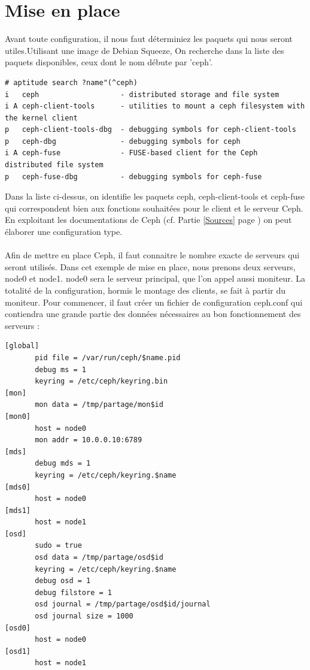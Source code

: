 \documentclass[12pt]{report}
\begin{document}
		        \section{Mise en place}
		                       Avant toute configuration, il nous faut déterminiez les paquets qui nous seront utiles.Utilisant une image de Debian Squeeze, On recherche dans la liste des paquets disponibles, ceux dont le nom débute par 'ceph'.
		                       \begin{lstlisting}
# aptitude search ?name"(^ceph)
i   ceph                   - distributed storage and file system                                         
i A ceph-client-tools      - utilities to mount a ceph filesystem with the kernel client                 
p   ceph-client-tools-dbg  - debugging symbols for ceph-client-tools                                     
p   ceph-dbg               - debugging symbols for ceph                                                  
i A ceph-fuse              - FUSE-based client for the Ceph distributed file system                      
p   ceph-fuse-dbg          - debugging symbols for ceph-fuse
                                       \end{lstlisting}	        
                                       Dans la liste ci-dessus, on identifie les paquets ceph, ceph-client-tools et ceph-fuse qui correspondent bien aux fonctions souhaitées pour le client et le serveur Ceph.
                                       En exploitant les documentations de Ceph (cf. Partie \ref{Sources} page \pageref{Sources}) on peut élaborer une configuration type.\\\\       
		                       Afin de mettre en place Ceph, il faut connaitre le nombre exacte de serveurs qui seront utilisés. Dans cet exemple de mise en place, nous prenons deux serveurs, node0 et node1. node0 sera le serveur principal, que l'on appel aussi moniteur. La totalité de la configuration, hormis le montage des clients, se fait à partir du moniteur. Pour commencer, il faut créer un fichier de configuration ceph.conf qui contiendra une grande partie des données nécessaires au bon fonctionnement des serveurs :
		           \begin{lstlisting}
[global]
       pid file = /var/run/ceph/$name.pid
       debug ms = 1
       keyring = /etc/ceph/keyring.bin
[mon]
       mon data = /tmp/partage/mon$id
[mon0]
       host = node0
       mon addr = 10.0.0.10:6789
[mds]
       debug mds = 1
       keyring = /etc/ceph/keyring.$name
[mds0]
       host = node0
[mds1]
       host = node1
[osd]
       sudo = true
       osd data = /tmp/partage/osd$id
       keyring = /etc/ceph/keyring.$name
       debug osd = 1
       debug filstore = 1
       osd journal = /tmp/partage/osd$id/journal
       osd journal size = 1000
[osd0]
       host = node0
[osd1]
       host = node1

		           \end{lstlisting}           
\end{document}
